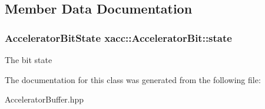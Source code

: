\subsection{Member Data Documentation}
\subsubsection[{\texorpdfstring{state}{state}}]{\setlength{\rightskip}{0pt plus 5cm}Accelerator\+Bit\+State xacc\+::\+Accelerator\+Bit\+::state\hspace{0.3cm}{\ttfamily [protected]}}\hypertarget{a00018_a4632123ac31aeed0dc97c65f8c792a85}{}\label{a00018_a4632123ac31aeed0dc97c65f8c792a85}
The bit state 

The documentation for this class was generated from the following file\+:\begin{DoxyCompactItemize}
\item 
Accelerator\+Buffer.\+hpp\end{DoxyCompactItemize}
